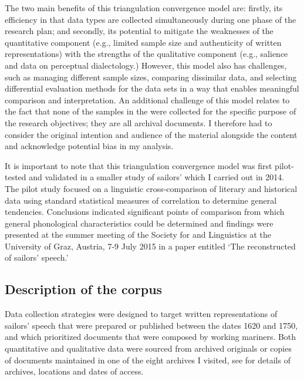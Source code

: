 The two main benefits of this triangulation convergence model are: firstly, its efficiency in that data types are collected simultaneously during one phase of the research plan; and secondly, its potential to mitigate the weaknesses of the quantitative component (e.g., limited sample size and authenticity of written representations) with the strengths of the qualitative component (e.g., salience and data on perceptual dialectology.) However, this model also has challenges, such as managing different sample sizes, comparing dissimilar data, and selecting differential evaluation methods for the data sets in a way that enables meaningful comparison and interpretation. An additional challenge of this model relates to the fact that none of the samples in the  were collected for the specific purpose of the research objectives; they are all archival documents. I therefore had to consider the original intention and audience of the material alongside the content and acknowledge potential bias in my analysis. 



It is important to note that this triangulation convergence model was first pilot-tested and validated in a smaller study of sailors’  which I carried out in 2014. The pilot study focused on a linguistic cross-comparison of literary and historical data using standard statistical measures of correlation to determine general tendencies. Conclusions indicated significant points of comparison from which general phonological characteristics could be determined and findings were presented at the summer meeting of the Society for  and  Linguistics at the University of Graz, Austria, 7-9 July {2015} in a paper entitled ‘The reconstructed  of  sailors’ speech.’



\subsection{{Description of the corpus}}\label{sec:1.3.2}



Data collection strategies were designed to target written representations of sailors’ speech that were prepared or published between the dates 1620 and 1750, and which prioritized documents that were composed by working mariners. Both quantitative and qualitative data were sourced from archived originals or copies of documents maintained in one of the eight archives I visited, see  for details of archives, locations and dates of access.


